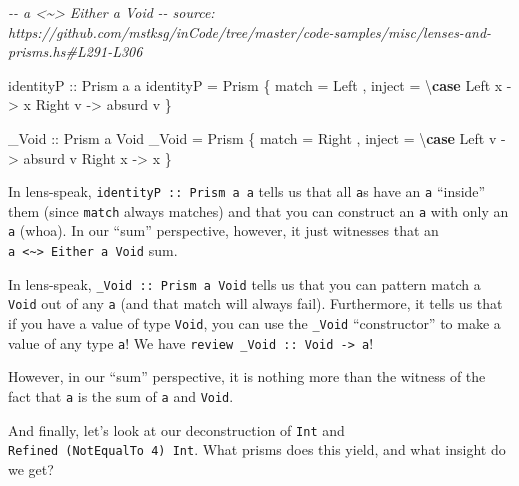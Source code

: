 \documentclass[]{article}
\newenvironment{Shaded}{}{}
\newcommand{\CommentTok}[1]{\textcolor[rgb]{0.38,0.63,0.69}{\textit{#1}}}
\newcommand{\DataTypeTok}[1]{\textcolor[rgb]{0.56,0.13,0.00}{#1}}
\newcommand{\KeywordTok}[1]{\textcolor[rgb]{0.00,0.44,0.13}{\textbf{#1}}}
\newcommand{\NormalTok}[1]{#1}
\newcommand{\OtherTok}[1]{\textcolor[rgb]{0.00,0.44,0.13}{#1}}
\begin{document}
\begin{Shaded}
\begin{Highlighting}[]
\CommentTok{{-}{-} a <\textasciitilde{}> Either a Void}
\CommentTok{{-}{-} source: https://github.com/mstksg/inCode/tree/master/code{-}samples/misc/lenses{-}and{-}prisms.hs\#L291{-}L306}

\OtherTok{identityP ::} \DataTypeTok{Prism\textquotesingle{}}\NormalTok{ a a}
\NormalTok{identityP }\OtherTok{=} \DataTypeTok{Prism\textquotesingle{}}
\NormalTok{    \{ match }\OtherTok{=} \DataTypeTok{Left}
\NormalTok{    , inject }\OtherTok{=}\NormalTok{ \textbackslash{}}\KeywordTok{case}
        \DataTypeTok{Left}\NormalTok{  x }\OtherTok{{-}>}\NormalTok{ x}
        \DataTypeTok{Right}\NormalTok{ v }\OtherTok{{-}>}\NormalTok{ absurd v}
\NormalTok{    \}}

\OtherTok{\_Void ::} \DataTypeTok{Prism\textquotesingle{}}\NormalTok{ a }\DataTypeTok{Void}
\NormalTok{\_Void }\OtherTok{=} \DataTypeTok{Prism\textquotesingle{}}
\NormalTok{    \{ match }\OtherTok{=} \DataTypeTok{Right}
\NormalTok{    , inject }\OtherTok{=}\NormalTok{ \textbackslash{}}\KeywordTok{case}
        \DataTypeTok{Left}\NormalTok{  v }\OtherTok{{-}>}\NormalTok{ absurd v}
        \DataTypeTok{Right}\NormalTok{ x }\OtherTok{{-}>}\NormalTok{ x}
\NormalTok{    \}}
\end{Highlighting}
\end{Shaded}

In lens-speak, \texttt{identityP\ ::\ Prism\textquotesingle{}\ a\ a} tells us
that all \texttt{a}s have an \texttt{a} ``inside'' them (since \texttt{match}
always matches) and that you can construct an \texttt{a} with only an \texttt{a}
(whoa). In our ``sum'' perspective, however, it just witnesses that an
\texttt{a\ \textless{}\textasciitilde{}\textgreater{}\ Either\ a\ Void} sum.

In lens-speak, \texttt{\_Void\ ::\ Prism\textquotesingle{}\ a\ Void} tells us
that you can pattern match a \texttt{Void} out of any \texttt{a} (and that match
will always fail). Furthermore, it tells us that if you have a value of type
\texttt{Void}, you can use the \texttt{\_Void} ``constructor'' to make a value
of any type \texttt{a}! We have
\texttt{review\ \_Void\ ::\ Void\ -\textgreater{}\ a}!

However, in our ``sum'' perspective, it is nothing more than the witness of the
fact that \texttt{a} is the sum of \texttt{a} and \texttt{Void}.

And finally, let's look at our deconstruction of \texttt{Int} and
\texttt{Refined\ (NotEqualTo\ 4)\ Int}. What prisms does this yield, and what
insight do we get?
\end{document}
